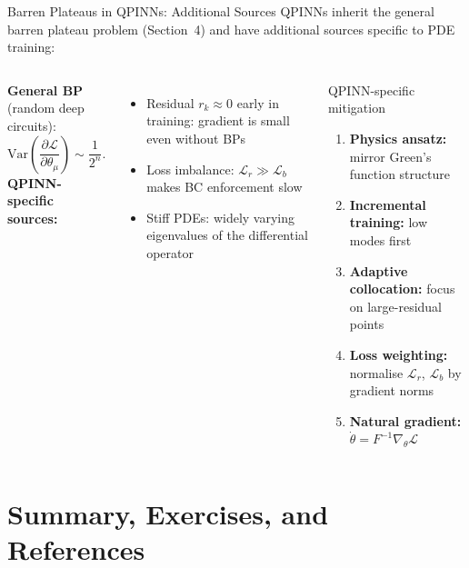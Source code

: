 \documentclass[aspectratio=169,11pt]{beamer}
\newcommand{\Variance}{\mathrm{Var}}
\begin{document}
\begin{frame}{Barren Plateaus in QPINNs: Additional Sources}
  QPINNs inherit the general barren plateau problem
  (Section~4) and have additional sources specific to PDE training:
  \begin{columns}[T]
    \textbf{General BP} (random deep circuits):
    \[
      \Variance\!\left(
        \frac{\partial\mathcal{L}}{\partial\theta_\mu}
      \right)\sim\frac{1}{2^n}.
    \]
    \textbf{QPINN-specific sources:}
    \begin{itemize}
      \item Residual $r_k\approx 0$ early in training:
            gradient is small even without BPs
      \item Loss imbalance:
            $\mathcal{L}_r\gg\mathcal{L}_b$
            makes BC enforcement slow
      \item Stiff PDEs: widely varying eigenvalues
            of the differential operator
    \end{itemize}
    \begin{block}{QPINN-specific mitigation}
      \begin{enumerate}\itemsep2pt\small
        \item \textbf{Physics ansatz:} mirror Green's function structure
        \item \textbf{Incremental training:} low modes first
        \item \textbf{Adaptive collocation:} focus on large-residual points
        \item \textbf{Loss weighting:} normalise $\mathcal{L}_r$,
              $\mathcal{L}_b$ by gradient norms
        \item \textbf{Natural gradient:}
              $\dot\theta = F^{-1}\nabla_\theta\mathcal{L}$
      \end{enumerate}
    \end{block}
  \end{columns}
\end{frame}

\section{Summary, Exercises, and References}
\end{document}
